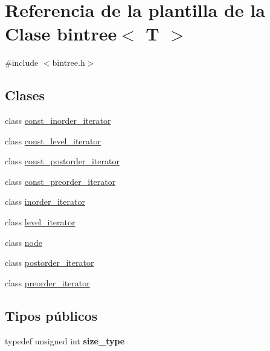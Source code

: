 \hypertarget{classbintree}{}\section{Referencia de la plantilla de la Clase bintree$<$ T $>$}
\label{classbintree}


{\ttfamily \#include $<$bintree.\+h$>$}

\subsection*{Clases}
\begin{DoxyCompactItemize}
\item 
class \hyperlink{classbintree_1_1const__inorder__iterator}{const\+\_\+inorder\+\_\+iterator}
\item 
class \hyperlink{classbintree_1_1const__level__iterator}{const\+\_\+level\+\_\+iterator}
\item 
class \hyperlink{classbintree_1_1const__postorder__iterator}{const\+\_\+postorder\+\_\+iterator}
\item 
class \hyperlink{classbintree_1_1const__preorder__iterator}{const\+\_\+preorder\+\_\+iterator}
\item 
class \hyperlink{classbintree_1_1inorder__iterator}{inorder\+\_\+iterator}
\item 
class \hyperlink{classbintree_1_1level__iterator}{level\+\_\+iterator}
\item 
class \hyperlink{classbintree_1_1node}{node}
\item 
class \hyperlink{classbintree_1_1postorder__iterator}{postorder\+\_\+iterator}
\item 
class \hyperlink{classbintree_1_1preorder__iterator}{preorder\+\_\+iterator}
\end{DoxyCompactItemize}
\subsection*{Tipos públicos}
\begin{DoxyCompactItemize}
\item 
typedef unsigned int {\bfseries size\+\_\+type}\hypertarget{classbintree_a267f374b5d239f2415552901c864179f}{}\label{classbintree_a267f374b5d239f2415552901c864179f}

\end{DoxyCompactItemize}
